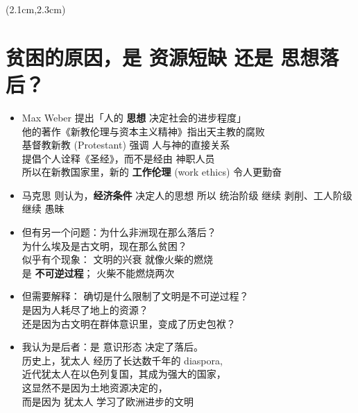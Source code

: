 \begin{preview}
\begin{textblock*}{5cm}(2.1cm,2.3cm) %
	{\color{red}{\large \textcircled{\small \themypage}}}
	\addtocounter{mypage}{1}
\end{textblock*}
	
\begin{minipage}{\textwidth}
\setlength{\parskip}{0.4\baselineskip}

\section{贫困的原因，是 资源短缺 还是 思想落后？}

\begin{itemize}
	\item Max Weber 提出「人的 \textbf{思想} 决定社会的进步程度」\\
		他的著作《新教伦理与资本主义精神》指出天主教的腐败 \\
		基督教新教 (Protestant) 强调 人与神的直接关系 \\
		提倡个人诠释《圣经》，而不是经由 神职人员 \\
		所以在新教国家里，新的 \textbf{工作伦理} (work ethics) 令人更勤奋

	\item 马克思 则认为，\textbf{经济条件} 决定人的思想
		所以 统治阶级 继续 剥削、工人阶级 继续 愚昧
	

	\item 但有另一个问题：为什么非洲现在那么落后？ \\
	为什么埃及是古文明，现在那么贫困？ \\
	似乎有个现象： 文明的兴衰 就像火柴的燃烧 \\
	是 \textbf{不可逆过程}； 火柴不能燃烧两次
	\item 但需要解释： 确切是什么限制了文明是不可逆过程？ \\
	是因为人耗尽了地上的资源？\\
	还是因为古文明在群体意识里，变成了历史包袱？
	\item 我认为是后者：是 意识形态 决定了落后。\\
	历史上，犹太人 经历了长达数千年的 diaspora,\\
	近代犹太人在以色列复国，其成为强大的国家，\\
	这显然不是因为土地资源决定的，\\
	而是因为 犹太人 学习了欧洲进步的文明

\end{itemize}
		
\end{minipage}
\end{preview}

